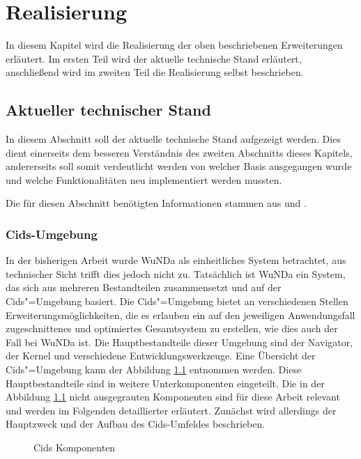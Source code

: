 \chapter{Realisierung} \label{ch:realisierung}

In diesem Kapitel wird die Realisierung der oben beschriebenen Erweiterungen erläutert.
Im ersten Teil wird der aktuelle technische Stand erläutert, anschließend wird im zweiten Teil die Realisierung selbst beschrieben. 

\section{Aktueller technischer Stand}

In diesem Abschnitt soll der aktuelle technische Stand aufgezeigt werden.
Dies dient einerseits dem besseren Verständnis des zweiten Abschnitts dieses Kapitels, andererseits soll somit verdeutlicht werden von welcher Basis ausgegangen wurde und welche Funktionalitäten neu implementiert werden mussten.

Die für diesen Abschnitt benötigten Informationen stammen aus \autocite{cismet-cids} und \autocite{cismet-readme}.

\subsection{Cids-Umgebung}
In der bisherigen Arbeit wurde \ac{WuNDa} als einheitliches System betrachtet, aus technischer Sicht trifft dies jedoch nicht zu.
Tatsächlich ist \ac{WuNDa} ein System, das sich aus mehreren Bestandteilen zusammensetzt und auf der Cids"=Umgebung basiert.
Die Cids"=Umgebung bietet an verschiedenen Stellen Erweiterungsmöglichkeiten, die es erlauben ein auf den jeweiligen Anwendungsfall zugeschnittenes und optimiertes Gesamtsystem zu erstellen, wie dies auch der Fall bei \ac{WuNDa} ist.
Die Hauptbestandteile dieser Umgebung sind der Navigator, der Kernel und verschiedene Entwicklungswerkzeuge.
Eine Übersicht der Cids"=Umgebung kann der Abbildung \ref{fig:cids-komponenten} entnommen werden.
Diese Hauptbestandteile sind in weitere Unterkomponenten eingeteilt. Die in der Abbildung \ref{fig:cids-komponenten} nicht ausgegrauten Komponenten sind für diese Arbeit relevant und werden im Folgenden detaillierter erläutert.
Zunächst wird allerdings der Hauptzweck und der Aufbau des Cids-Umfeldes beschrieben.

\begin{figure}[htb]
	\centering
	\caption{Cids Komponenten}
	\label{fig:cids-komponenten}
\end{figure}

